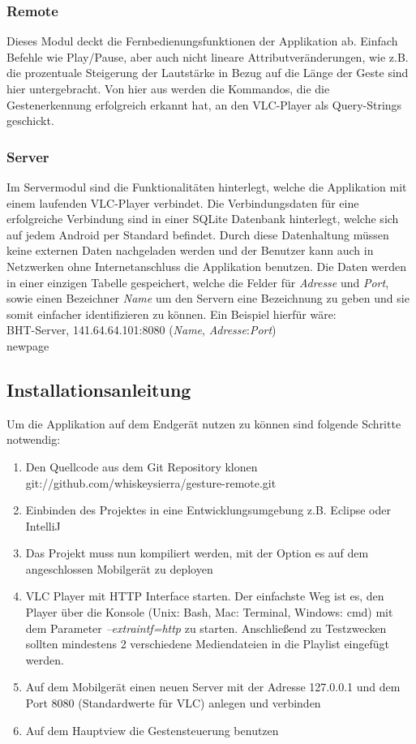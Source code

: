 \documentclass[a4paper,12pt]{article}
\begin{document}
\subsubsection{Remote}
Dieses Modul deckt die Fernbedienungsfunktionen der Applikation ab. Einfach Befehle wie Play/Pause, aber auch nicht lineare Attributveränderungen, wie z.B. die prozentuale Steigerung der Lautstärke in Bezug auf die Länge der Geste sind hier untergebracht. Von hier aus werden die Kommandos, die die Gestenerkennung erfolgreich erkannt hat, an den VLC-Player als Query-Strings geschickt.
\subsubsection{Server}
Im Servermodul sind die Funktionalitäten hinterlegt, welche die Applikation mit einem laufenden VLC-Player verbindet. Die Verbindungsdaten für eine erfolgreiche Verbindung sind in einer SQLite Datenbank hinterlegt, welche sich auf jedem Android per Standard befindet. Durch diese Datenhaltung müssen keine externen Daten nachgeladen werden und der Benutzer kann auch in Netzwerken ohne Internetanschluss die Applikation benutzen.
Die Daten werden in einer einzigen Tabelle gespeichert, welche die Felder für \textit{Adresse} und \textit{Port}, sowie einen Bezeichner \textit{Name} um den Servern eine Bezeichnung zu geben und sie somit einfacher identifizieren zu können. Ein Beispiel hierfür wäre: \\
BHT-Server, 141.64.64.101:8080 (\textit{Name}, \textit{Adresse}:\textit{Port})\\

newpage
\subsection{Installationsanleitung}
Um die Applikation auf dem Endgerät nutzen zu können sind folgende Schritte notwendig:
\begin{enumerate}
\item Den Quellcode aus dem Git Repository klonen \\git://github.com/whiskeysierra/gesture-remote.git
\item Einbinden des Projektes in eine Entwicklungsumgebung z.B. Eclipse oder IntelliJ
\item Das Projekt muss nun kompiliert werden, mit der Option es auf dem angeschlossen Mobilgerät zu deployen
\item VLC Player mit HTTP Interface starten. Der einfachste Weg ist es, den Player über die Konsole (Unix: Bash, Mac: Terminal, Windows: cmd) mit dem Parameter \textit{--extraintf=http} zu starten. Anschließend zu Testzwecken sollten mindestens 2 verschiedene Mediendateien in die Playlist eingefügt werden.
\item Auf dem Mobilgerät einen neuen Server mit der Adresse 127.0.0.1 und dem Port 8080 (Standardwerte für VLC) anlegen und verbinden
\item Auf dem Hauptview die Gestensteuerung benutzen
\end{enumerate}
\newpage
\end{document}
